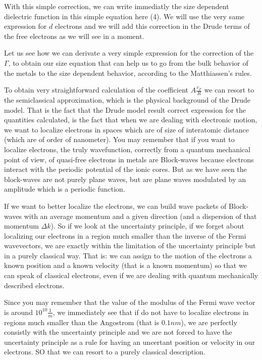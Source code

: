 \documentclass[../main/main.tex]{subfiles}
\begin{document}
With this simple correction, we can write immediatly the size dependent dielectric function in this simple equation here (4). We will use the very same expression for \( d \) electrons and we will add this correction in the Drude terms of the free electrons as we will see in a moment.



Let us see how we can derivate a very simple expression for the correction of the \( \Gamma  \), to obtain our size equation that can help us to go from the bulk behavior of the metals to the size dependent behavior, according to the Matthiassen's rules.

To obtain very straightforward calculation of the coefficient \( A \frac{v_F}{R} \) we can resort to the semiclassical approximation, which is the physical background of the Drude model. That is the fact that the Drude model result correct expression for the quantities calculated, is the fact that when we are dealing with electronic motion, we want to localize electrons in spaces which are of size of interatomic distance (which are of order of nanometer).
You may remember that if you want to localize electrons, the truly wavefunction, correctly from a quantum mechanical point of view, of quasi-free electrons in metals are Block-waves because electrons interact with the periodic potential of the ionic cores. But as we have seen the block-waves are not purely plane waves, but are plane waves modulated by an amplitude which is a periodic function.

If we want to better localize the electrons, we can build wave packets of Block-waves with an average momentum and a given direction (and a dispersion of that momentum \( \Delta k \)). So if we look at the uncertainty principle, if we forget about localizing our electrons in a region much smaller than the inverse of the Fermi wavevectors, we are exactly within the limitation of the uncertainty principle but in a purely classical way. That is: we can assign to the motion of the electrons a known position and a known velocity (that is a known momentum) so that we can speak of classical electrons, even if we are dealing with quantum mechanically described electrons.

Since you may remember that the value of the modulus of the Fermi wave vector is around \( 10^{10} \frac{1}{m} \), we immediately see that if do not have to localize electrons in regions much smaller than the Angostrom (that is \( 0.1 nm \)), we are perfectly consistly with the uncertainty principle and we are not forced to have the uncertainty principle as a rule for having an uncertant position or velocity in our electrons. SO that we can resort to a purely classical description.
\end{document}
